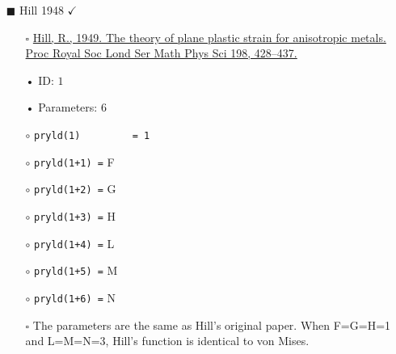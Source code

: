\documentclass[11pt,a4paper,twoside,final,onecolumn,titlepage]{article}
\newcommand{\verified}{\hspace{0.5pt} {\LARGE $\checkmark$}}
\begin{document}
\begin{itemize}
	\item[\tiny$\blacksquare$] Hill 1948 \verified{}
	\begin{itemize}
		\item[\tiny$\square$] {\small \href{https://doi.org/10.1098/rspa.1949.0110}{Hill, R., 1949. The theory of plane plastic strain for anisotropic metals. Proc Royal Soc Lond Ser Math Phys Sci 198, 428–437.}}\\
		\item[•] ID: $1$
		\item[•] Parameters: $6$\\
		\item[$\circ$] \texttt{pryld(1)\,\,\,\,\,\,\,\,\,= 1}
		\item[$\circ$] \texttt{pryld(1+1) =} F
		\item[$\circ$] \texttt{pryld(1+2) =} G
		\item[$\circ$] \texttt{pryld(1+3) =} H
		\item[$\circ$] \texttt{pryld(1+4) =} L
		\item[$\circ$] \texttt{pryld(1+5) =} M
		\item[$\circ$] \texttt{pryld(1+6) =} N\\
		\item[\tiny$\square$] {\small The parameters are the same as Hill's original paper. When F=G=H=1 and L=M=N=3, Hill's function is identical to von Mises.}\\
	\end{itemize}
	
\end{itemize}
\end{document}
